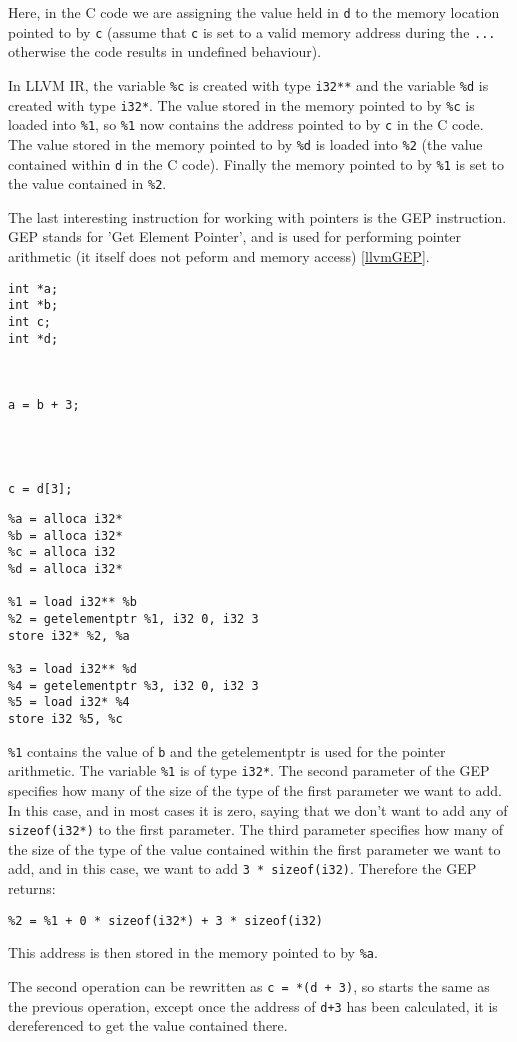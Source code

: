 Here, in the C code we are assigning the value held in \verb!d! to the memory location pointed to by \verb!c! (assume that \verb!c! is set to a valid memory address during the \verb!...! otherwise the code results in undefined behaviour).

In LLVM IR, the variable \verb!%c! is created with type \verb!i32**! and the variable \verb!%d! is created with type \verb!i32*!.
The value stored in the memory pointed to by \verb!%c! is loaded into \verb!%1!, so \verb!%1! now contains the address pointed to by \verb!c! in the C code.
The value stored in the memory pointed to by \verb!%d! is loaded into \verb!%2! (the value contained within \verb!d! in the C code).
Finally the memory pointed to by \verb!%1! is set to the value contained in \verb!%2!.

The last interesting instruction for working with pointers is the GEP instruction.
GEP stands for 'Get Element Pointer', and is used for performing pointer arithmetic (it itself does not peform and memory access) \ref{llvmGEP}.

\begin{minipage}[t]{0.3\linewidth}
\begin{verbatim}
int *a;
int *b;
int c;
int *d;



a = b + 3;




c = d[3];
\end{verbatim}
\end{minipage}
\begin{minipage}[t]{0.7\linewidth}
\begin{verbatim}
%a = alloca i32*
%b = alloca i32*
%c = alloca i32
%d = alloca i32*

%1 = load i32** %b
%2 = getelementptr %1, i32 0, i32 3
store i32* %2, %a

%3 = load i32** %d
%4 = getelementptr %3, i32 0, i32 3
%5 = load i32* %4
store i32 %5, %c
\end{verbatim}
\end{minipage}

\verb!%1! contains the value of \verb!b! and the getelementptr is used for the pointer arithmetic.
The variable \verb!%1! is of type \verb!i32*!.
The second parameter of the GEP specifies how many of the size of the type of the first parameter we want to add.
In this case, and in most cases it is zero, saying that we don't want to add any of \verb!sizeof(i32*)! to the first parameter.
The third parameter specifies how many of the size of the type of the value contained within the first parameter we want to add, and in this case, we want to add \verb!3 * sizeof(i32)!.
Therefore the GEP returns:

\begin{verbatim}
%2 = %1 + 0 * sizeof(i32*) + 3 * sizeof(i32)
\end{verbatim}

This address is then stored in the memory pointed to by \verb!%a!.

The second operation can be rewritten as \verb!c = *(d + 3)!, so starts the same as the previous operation, except once the address of \verb!d+3! has been calculated, it is dereferenced to get the value contained there.

